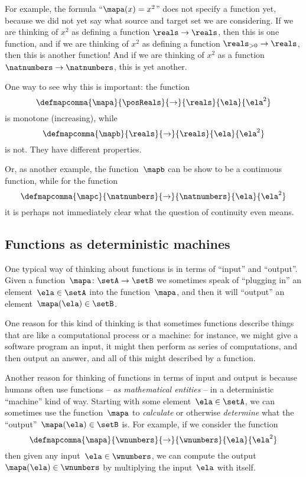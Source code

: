 For example, the formula ``$\mapa(x)=x^2$'' does not specify a function yet, because we did not yet say what source and target set we are considering.
If we are thinking of $x^2$ as defining a function $\reals \to \reals$, then this is one function, and if we are thinking of $x^2$ as defining a function $\reals_{> 0} \to \reals$, then this is another function!
And if we are thinking of $x^2$ as a function $\natnumbers \rightarrow \natnumbers$, this is yet another.

One way to see why this is important: the function
\begin{equation*}
    \defmapcomma{\mapa}{\posReals}{\to}{\reals}{\ela}{\ela^2}
\end{equation*}
is monotone (increasing), while
\begin{equation*}
    \defmapcomma{\mapb}{\reals}{\to}{\reals}{\ela}{\ela^2}
\end{equation*}
is not.
They have different properties.

Or, as another example, the function~$\mapb$ can be show to be a continuous function,
while for the function
\begin{equation*}
    \defmapcomma{\mapc}{\natnumbers}{\to}{\natnumbers}{\ela}{\ela^2}
\end{equation*}
it is perhaps not immediately clear what the question of continuity even means.

\subsection{Functions as deterministic machines}

One typical way of thinking about functions is in terms of ``input'' and ``output''.
Given a function~$\mapa\colon \setA \to \setB$ we sometimes speak of ``plugging in'' an element~$\ela \in \setA$ into the function~$\mapa$, and then it will ``output'' an element~$\mapa(\ela) \in \setB$.

One reason for this kind of thinking is that sometimes functions describe things that are like a computational process or a machine:
for instance, we might give a software program an input, it might then perform as series of computations, and then output an answer, and all of this might described by a function.

Another reason for thinking of functions in terms of input and output is because humans often use functions -- \emph{as mathematical entities} -- in a deterministic ``machine'' kind of way.
Starting with some element~$\ela \in \setA$, we can sometimes use the function~$\mapa$ to \emph{calculate} or otherwise \emph{determine} what the ``output''~$\mapa(\ela) \in \setB$ is.
For example, if we consider the function
\begin{equation}
    \label{eq:square-function-whole-numbers}
    \defmapcomma{\mapa}{\wnumbers}{\to}{\wnumbers}{\ela}{\ela^2}
\end{equation}
then given any input~$\ela \in \wnumbers$, we can compute the output~$\mapa(\ela) \in \wnumbers$ by multiplying the input~$\ela$ with itself.

